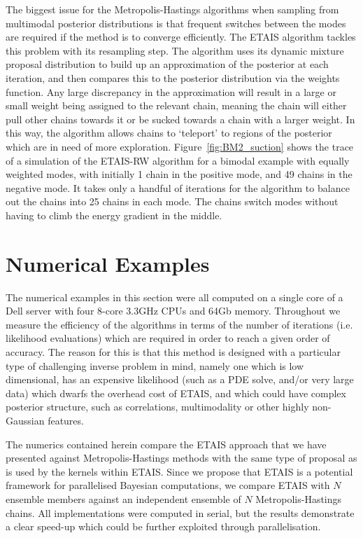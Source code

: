 \documentclass[final]{siamltex}
\newcommand{\revised}{}
\begin{document}
The biggest issue for the Metropolis-Hastings algorithms when sampling
from multimodal posterior distributions is that frequent switches
between the modes are required if the method is to converge
efficiently. The ETAIS algorithm tackles this problem with its
resampling step. The algorithm uses its dynamic mixture proposal distribution to build up an
approximation of the posterior at each iteration, and then compares
this to the posterior distribution via the weights function. Any large
discrepancy in the approximation will result in a large or small
weight being assigned to the relevant chain, meaning the chain will
either pull other chains towards it or be sucked towards a chain with
a larger weight. In this way, the algorithm allows chains to
`teleport' to regions of the posterior which are in need of more
exploration. Figure~\ref{fig:BM2_suction} shows the trace of a
simulation of the ETAIS-RW algorithm for a bimodal example with
equally weighted modes, with initially 1 chain in the
positive mode, and 49 chains in the negative mode. It takes only a
handful of iterations for the algorithm to balance out the chains into
25 chains in each mode. The chains switch modes without having to
climb the energy gradient in the middle.



\section{Numerical Examples}\label{Sec:Num}
The numerical examples in this section were all computed on a single
core of a Dell
server with four 8-core 3.3GHz CPUs and 64Gb memory. Throughout we
measure the efficiency of the algorithms in terms of the number of
iterations (i.e. likelihood evaluations) which are required in order
to reach a given order of accuracy. The reason for this is that this
method is designed with a particular type of challenging inverse
problem in mind, namely one which is low dimensional, has an expensive
likelihood (such as a PDE solve, and/or very large data) which dwarfs
the overhead cost of ETAIS, and which could have complex posterior
structure, such as correlations, multimodality or other highly
non-Gaussian features.

{\revised The numerics contained herein compare the ETAIS approach that we
  have presented against Metropolis-Hastings methods with
  the same type of proposal as is used by the kernels within
  ETAIS. Since we propose that ETAIS is a potential framework for
  parallelised Bayesian computations, we compare ETAIS with $N$
  ensemble members against an independent ensemble of $N$
  Metropolis-Hastings chains. All implementations were
  computed in serial, but the results demonstrate a clear speed-up
  which could be further exploited through parallelisation.
  }
\end{document}
